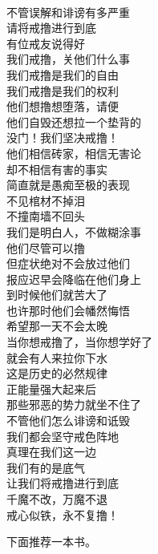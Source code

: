 \begin{poem}[将戒撸进行到底]
    \begin{multicols}{2}
        \begin{center}~\\
            不管误解和诽谤有多严重 \\ 请将戒撸进行到底 \\ 有位戒友说得好 \\ 我们戒撸，关他们什么事 \\ 我们戒撸是我们的自由 \\ 我们戒撸是我们的权利 \\ 他们想撸想堕落，请便 \\ 他们自毁还想拉一个垫背的 \\ 没门！我们坚决戒撸！ \\ 他们相信砖家，相信无害论 \\ 却不相信有害的事实 \\ 简直就是愚痴至极的表现 \\ 不见棺材不掉泪 \\ 不撞南墙不回头 \\ 我们是明白人，不做糊涂事 \\ 他们尽管可以撸 \\ 但症状绝对不会放过他们 \\ 报应迟早会降临在他们身上 \\ 到时候他们就苦大了 \\ 也许那时他们会幡然悔悟 \\ 希望那一天不会太晚 \\ 当你想戒撸了，当你想学好了 \\ 就会有人来拉你下水 \\ 这是历史的必然规律 \\ 正能量强大起来后 \\ 那些邪恶的势力就坐不住了 \\ 不管他们怎么诽谤和诋毁 \\ 我们都会坚守戒色阵地 \\ 真理在我们这一边 \\ 我们有的是底气 \\ 让我们将戒撸进行到底 \\ 千魔不改，万魔不退 \\ 戒心似铁，永不复撸！
        \end{center}
    \end{multicols}
\end{poem}

下面推荐一本书。

